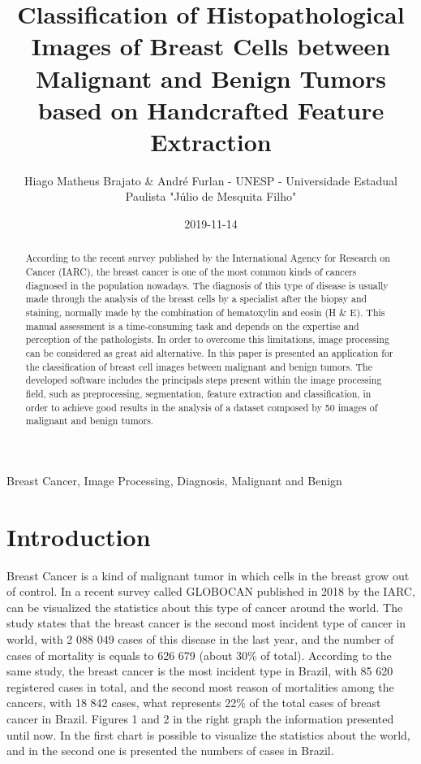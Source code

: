 \documentclass[conference]{IEEEtran}
\begin{document}
\title{Classification of Histopathological Images of Breast Cells between Malignant and Benign Tumors based on Handcrafted Feature Extraction}
\author{Hiago Matheus Brajato \& André Furlan - UNESP - Universidade Estadual Paulista "Júlio de Mesquita Filho"}
\date{2019-11-14}
\maketitle

\begin{abstract}
According to the recent survey published by the International Agency for Research on Cancer (IARC), the breast cancer is one of the most common kinds of cancers diagnosed in the population nowadays. The diagnosis of this type of disease is usually made through the analysis of the breast cells by a specialist after the biopsy and staining, normally made by the combination of hematoxylin and eosin (H \& E). This manual assessment is a time-consuming task and depends on the expertise and perception of the pathologists. In order to overcome this limitations, image processing can be considered as great aid alternative. In this paper is presented an application for the classification of breast cell images between malignant and benign tumors. The developed software includes the principals steps present within the image processing field, such as preprocessing, segmentation, feature extraction and classification, in order to achieve good results in the analysis of a dataset composed by 50 images of malignant and benign tumors.
\end{abstract}

\begin{IEEEkeywords}
Breast Cancer, Image Processing, Diagnosis, Malignant and Benign
\end{IEEEkeywords}

\section{Introduction}
\par Breast Cancer is a kind of malignant tumor in which cells in the breast grow out of control. In a recent survey called GLOBOCAN \cite{GLOBOCAN} published in 2018 by the IARC, can be visualized the statistics about this type of cancer around the world. The study states that the breast cancer is the second most incident type of cancer in world, with 2 088 049 cases of this disease in the last year, and the number of cases of mortality is equals to 626 679 (about 30\% of total). According to the same study, the breast cancer is the most incident type in Brazil, with 85 620 registered cases in total, and the second most reason of mortalities among the cancers, with 18 842 cases, what represents 22\% of the total cases of breast cancer in Brazil. Figures 1 and 2 in the right graph the information presented until now. In the first chart is possible to visualize the statistics about the world, and in the second one is presented the numbers of cases in Brazil.
\end{document}
